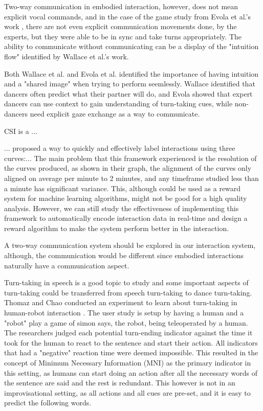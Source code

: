 \documentclass[final,5p,times,twocolumn,authoryear]{article}
\begin{document}
Two-way communication in embodied interaction, however, does not mean
explicit vocal commands, and in the case of the game study from Evola et
al.'s work \cite{Evola}, there are not even explicit communication
movements done, by the experts, but they were able to be in sync and
take turns appropriately. The ability to communicate without
communicating can be a display of the "intuition flow" identified by
Wallace et al.'s work.

Both Wallace et al. and Evola et al. identified the importance of having
intuition and a "shared image" when trying to perform seemlessly.
Wallace identified that dancers often predict what their partner will
do, and Evola showed that expert dancers can use context to gain
understanding of turn-taking cues, while non-dancers need explicit gaze
exchange as a way to communicate. 


CSI is a ...

... proposed a way to quickly and effectively label interactions using
three curves:...
The main problem that this framework experienced is the resolution of
the curves produced, as shown in their graph, the alignment of the
curves only aligned on average per minute to 2 minutes, and any
timeframe studied less than a minute has significant variance. This,
although could be used as a reward system for machine learning
algorithms, might not be good for a high quality analysis. However, we
can still study the effectiveness of implementing this framework to
automatically encode interaction data in real-time and design a reward
algorithm to make the system perform better in the interaction.

A two-way communication system should be explored in our interaction
system, although, the communication would be different since embodied
interactions naturally have a communication aspect.

Turn-taking in speech is a good topic to study and some important
aspects of turn-taking could be transferred from speech turn-taking to
dance turn-taking. 
Thomaz and Chao conducted an experiment to learn about
turn-taking in human-robot interaction \cite{Thomaz2011}. The user study is setup by having a human and a
"robot" play a game of simon says, the robot, being teleoperated by a human. The researchers judged each
potential turn-ending indicator against the time it took for the human
to react to the sentence and start their action. All indicators that had
a "negative" reaction time were deemed impossible. This
resulted in the concept of Minimum Necessary Information (MNI) as the
primary indicator in this setting, as humans can start doing an action
after all the necessary words of the sentence are said and the rest is
redundant. This however is not in an improvisational setting, as all
actions and all cues are pre-set, and it is easy to predict the
following words. 
\end{document}
